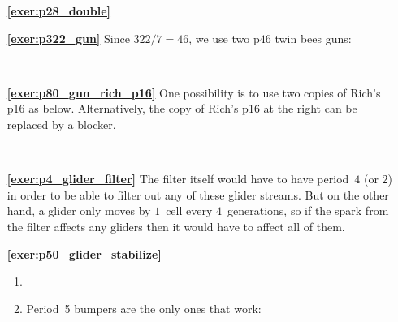 \begin{multicols}{2}
	\begin{itemize}[leftmargin=0em]
		\item[\bf\color{ocre}\sffamily\ref{exer:p28_double}] \\
		
		
		\item[\bf\color{ocre}\sffamily\ref{exer:p322_gun}] Since $322/7 = 46$, we use two p$46$ twin bees guns:
		\begin{center}
			\\
		\end{center}
		
		
		\item[\bf\color{ocre}\sffamily\ref{exer:p80_gun_rich_p16}] One possibility is to use two copies of Rich's p16 as below. Alternatively, the copy of Rich's p16 at the right can be replaced by a blocker.
		\begin{center}
			\\
		\end{center}
		
		
		\item[\bf\color{ocre}\sffamily\ref{exer:p4_glider_filter}] The filter itself would have to have period~$4$ (or $2$) in order to be able to filter out any of these glider streams. But on the other hand, a glider only moves by $1$~cell every $4$~generations, so if the spark from the filter affects any gliders then it would have to affect all of them.\\
		
		
		\item[\bf\color{ocre}\sffamily\ref{exer:p50_glider_stabilize}] \begin{enumerate}[leftmargin=1.5em,label=\bf\color{ocre}(\alph*)]
			\item {} \\
			
			\item Period~5 bumpers are the only ones that work:
			\begin{center}
				 \\
			\end{center}
		\end{enumerate}
	\end{itemize}
\end{multicols}




